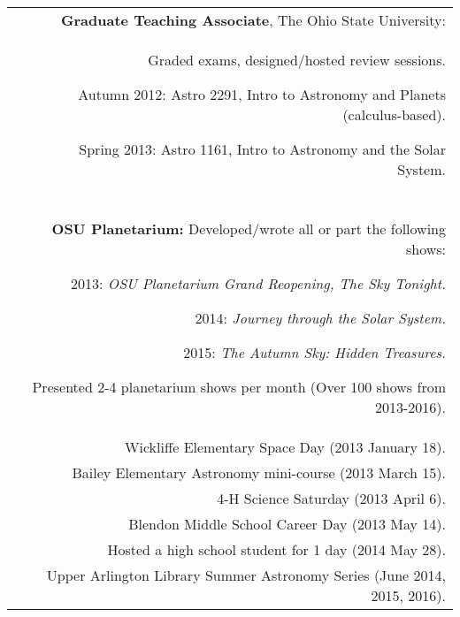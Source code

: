 \documentclass[letterpaper,12pt]{article}
\begin{document}
\begin{longtable}{LR}
\underline{} &  
\textbf{Graduate Teaching Associate}, The Ohio State University:\\
\underline{}&  Graded exams, designed/hosted review sessions.
\begin{compactitem}
\item Autumn 2012: \hspace{2mm}Astro 2291,  Intro to Astronomy and Planets (calculus-based).
\item Spring 2013: \hspace{4.8mm}Astro 1161,  Intro to Astronomy and the Solar System.
\end{compactitem}
\\




\underline{}\\\underline{} 
&\textbf{OSU Planetarium:} Developed/wrote all or part the following shows:
\begin{compactitem}
\item 2013:  \textit{OSU Planetarium Grand Reopening, The Sky Tonight.}
\item 2014:  \textit{Journey through the Solar System.}
\item 2015:  \textit{The Autumn Sky:  Hidden Treasures.}
\end{compactitem}
\noindent Presented 2-4 planetarium shows per month (Over 100 shows from 2013-2016).\\
&Wickliffe Elementary Space Day (2013 January 18).\\
&Bailey Elementary Astronomy mini-course (2013 March 15).\\
&4-H Science Saturday (2013 April 6).\\
&Blendon Middle School Career Day (2013 May 14).\\
&Hosted a high school student for 1 day (2014 May 28).\\
&Upper Arlington Library Summer Astronomy Series (June 2014, 2015, 2016).\\

\end{longtable}
\clearpage
\end{document}
